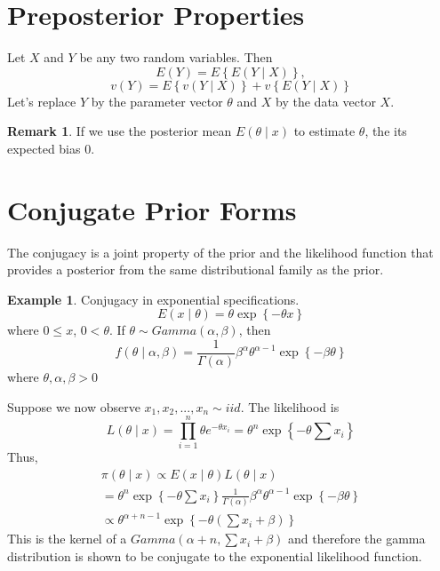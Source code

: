 \documentclass[lecture,12pt,]{pcms-l}
\numberwithin{section}{chapter}
\numberwithin{equation}{chapter}
\theoremstyle{plain}
\theoremstyle{definition}
\newtheorem{example}{Example}[section]
\theoremstyle{definition}
\newtheorem*{remark}{Remark}
\begin{document}
\section{Preposterior Properties}
Let $X$ and $Y$ be any two random variables. Then
\begin{equation}
E(Y)=E\left \{  E(Y \mid X)\right \},
\end{equation}
\begin{equation}
v(Y)=E \left \{  v(Y \mid X)\right \}+ v\left \{  E(Y \mid X)\right \}
\end{equation}
Let's replace $Y$ by the parameter vector $\theta$ and $X$ by the data vector $X$.
\begin{remark}
If we use the posterior mean $E(\theta \mid x)$ to estimate $\theta$, the its expected bias $0$.
\end{remark}

\section{Conjugate Prior Forms}
The conjugacy is a joint property of the prior and the likelihood function that provides a posterior from the same distributional family as the prior.

\begin{example}
Conjugacy in exponential specifications.
\begin{equation}
E(x\mid \theta)=\theta \exp \left \{  -\theta x\right \}
\end{equation}
where $0 \leq x$, $0<\theta$. If $\theta \sim Gamma(\alpha , \beta)$, then
\begin{equation}
f(\theta \mid \alpha, \beta)=\frac{1}{\Gamma(\alpha)}\beta^{\alpha}\theta^{\alpha -1} \exp \left \{  -\beta \theta \right \}
\end{equation}
where $\theta, \alpha, \beta > 0$
\end{example}
Suppose we now observe $x_1,x_2,...,x_n \sim iid$. The likelihood is 
\begin{equation}
L(\theta \mid x)=\prod_{i=1}^{n} \theta e^{-\theta x_i}=\theta^n \exp \left \{  - \theta \sum x_i\right \}
\end{equation}
Thus,
\begin{equation}
\begin{split}
\pi(\theta \mid x) \propto E(x \mid \theta)L(\theta \mid x)
\\
=\theta^n \exp \left \{  - \theta \sum x_i\right \} \frac{1}{\Gamma(\alpha)}\beta^{\alpha}\theta^{\alpha -1} \exp \left \{  -\beta \theta \right \}
\\
\propto \theta^{\alpha +n -1} \exp \left \{  - \theta( \sum x_i + \beta)\right \}
\end{split}
\end{equation}
This is the kernel of a $Gamma(\alpha+n,\sum x_i + \beta)$ and therefore the gamma distribution is shown to be conjugate to the exponential likelihood function.
\end{document}
